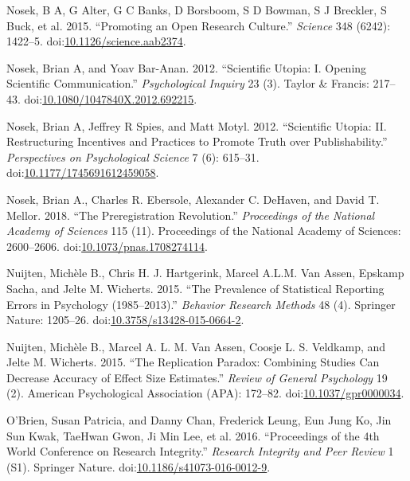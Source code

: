 \documentclass[a5paper]{book}
\begin{document}
\hypertarget{ref-doi:10.1126ux2fscience.aab2374}{}
Nosek, B A, G Alter, G C Banks, D Borsboom, S D Bowman, S J Breckler, S
Buck, et al. 2015. ``Promoting an Open Research Culture.''
\emph{Science} 348 (6242): 1422--5.
doi:\href{https://doi.org/10.1126/science.aab2374}{10.1126/science.aab2374}.

\hypertarget{ref-doi:10.1080ux2f1047840X.2012.692215}{}
Nosek, Brian A, and Yoav Bar-Anan. 2012. ``Scientific Utopia: I. Opening
Scientific Communication.'' \emph{Psychological Inquiry} 23 (3). Taylor
\& Francis: 217--43.
doi:\href{https://doi.org/10.1080/1047840X.2012.692215}{10.1080/1047840X.2012.692215}.

\hypertarget{ref-doi:10.1177ux2f1745691612459058}{}
Nosek, Brian A, Jeffrey R Spies, and Matt Motyl. 2012. ``Scientific
Utopia: II. Restructuring Incentives and Practices to Promote Truth over
Publishability.'' \emph{Perspectives on Psychological Science} 7 (6):
615--31.
doi:\href{https://doi.org/10.1177/1745691612459058}{10.1177/1745691612459058}.

\hypertarget{ref-doi:10.1073ux2fpnas.1708274114}{}
Nosek, Brian A., Charles R. Ebersole, Alexander C. DeHaven, and David T.
Mellor. 2018. ``The Preregistration Revolution.'' \emph{Proceedings of
the National Academy of Sciences} 115 (11). Proceedings of the National
Academy of Sciences: 2600--2606.
doi:\href{https://doi.org/10.1073/pnas.1708274114}{10.1073/pnas.1708274114}.

\hypertarget{ref-doi:10.3758ux2fs13428-015-0664-2}{}
Nuijten, Michèle B., Chris H. J. Hartgerink, Marcel A.L.M. Van Assen,
Epskamp Sacha, and Jelte M. Wicherts. 2015. ``The Prevalence of
Statistical Reporting Errors in Psychology (1985--2013).''
\emph{Behavior Research Methods} 48 (4). Springer Nature: 1205--26.
doi:\href{https://doi.org/10.3758/s13428-015-0664-2}{10.3758/s13428-015-0664-2}.

\hypertarget{ref-doi:10.1037ux2fgpr0000034}{}
Nuijten, Michèle B., Marcel A. L. M. Van Assen, Coosje L. S. Veldkamp,
and Jelte M. Wicherts. 2015. ``The Replication Paradox: Combining
Studies Can Decrease Accuracy of Effect Size Estimates.'' \emph{Review
of General Psychology} 19 (2). American Psychological Association (APA):
172--82.
doi:\href{https://doi.org/10.1037/gpr0000034}{10.1037/gpr0000034}.

\hypertarget{ref-doi:10.1186ux2fs41073-016-0012-9}{}
O'Brien, Susan Patricia, and Danny Chan, Frederick Leung, Eun Jung Ko,
Jin Sun Kwak, TaeHwan Gwon, Ji Min Lee, et al. 2016. ``Proceedings of
the 4th World Conference on Research Integrity.'' \emph{Research
Integrity and Peer Review} 1 (S1). Springer Nature.
doi:\href{https://doi.org/10.1186/s41073-016-0012-9}{10.1186/s41073-016-0012-9}.
\end{document}
